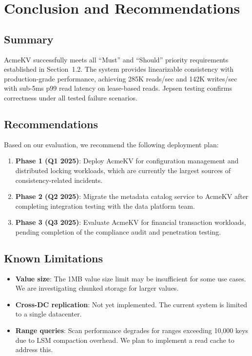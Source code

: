 \documentclass[12pt,a4paper]{report}
\begin{document}
\chapter{Conclusion and Recommendations}
\label{ch:conclusion}

\section{Summary}

AcmeKV successfully meets all ``Must'' and ``Should'' priority requirements established in Section~1.2. The system provides linearizable consistency with production-grade performance, achieving 285K reads/sec and 142K writes/sec with sub-5ms p99 read latency on lease-based reads. Jepsen testing confirms correctness under all tested failure scenarios.

\section{Recommendations}

Based on our evaluation, we recommend the following deployment plan:

\begin{enumerate}[itemsep=4pt]
  \item \textbf{Phase 1 (Q1 2025)}: Deploy AcmeKV for configuration management and distributed locking workloads, which are currently the largest sources of consistency-related incidents.
  \item \textbf{Phase 2 (Q2 2025)}: Migrate the metadata catalog service to AcmeKV after completing integration testing with the data platform team.
  \item \textbf{Phase 3 (Q3 2025)}: Evaluate AcmeKV for financial transaction workloads, pending completion of the compliance audit and penetration testing.
\end{enumerate}

\section{Known Limitations}

\begin{itemize}[itemsep=4pt]
  \item \textbf{Value size}: The 1MB value size limit may be insufficient for some use cases. We are investigating chunked storage for larger values.
  \item \textbf{Cross-DC replication}: Not yet implemented. The current system is limited to a single datacenter.
  \item \textbf{Range queries}: Scan performance degrades for ranges exceeding 10,000 keys due to LSM compaction overhead. We plan to implement a read cache to address this.
\end{itemize}
\end{document}
